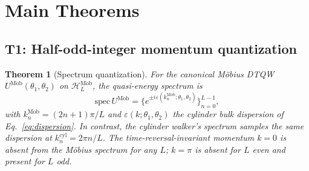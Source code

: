 \documentclass[aps,pra,reprint,amsmath,amssymb,superscriptaddress,nofootinbib,longbibliography]{revtex4-2}
\newcommand{\Mob}{\mathrm{M\ddot{o}b}}
\newcommand{\cyl}{\mathrm{cyl}}
\newtheorem{theorem}{Theorem}
\begin{document}
\section{Main Theorems}
\label{sec:theorems}

\subsection{T1: Half-odd-integer momentum quantization}

\begin{theorem}[Spectrum quantization]
\label{thm:T1}
For the canonical M\"obius DTQW $U^\Mob(\theta_1, \theta_2)$ on $\mathcal{H}_L^\Mob$, the quasi-energy spectrum is
\begin{equation}
\mathrm{spec}\,U^\Mob = \big\{e^{\pm i \varepsilon(k_n^\Mob; \theta_1, \theta_2)}\big\}_{n=0}^{L-1},
\end{equation}
with $k_n^\Mob = (2n+1)\pi/L$ and $\varepsilon(k; \theta_1, \theta_2)$ the cylinder bulk dispersion of Eq.~\eqref{eq:dispersion}. In contrast, the cylinder walker's spectrum samples the same dispersion at $k_n^\cyl = 2\pi n/L$. The time-reversal-invariant momentum $k = 0$ is absent from the M\"obius spectrum for any $L$; $k = \pi$ is absent for $L$ even and present for $L$ odd.
\end{theorem}
\end{document}
